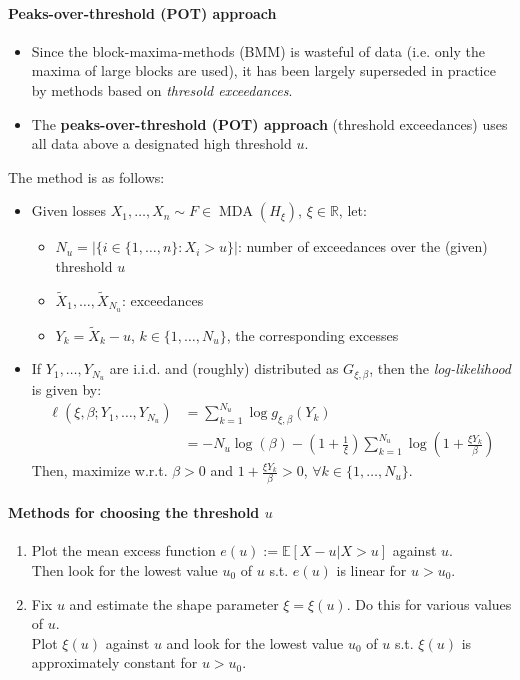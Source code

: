 \documentclass[a4paper,landscape,8pt,fleqn]{scrartcl}
\renewcommand{\emph}[1]{\textbf{#1}}
\DeclareMathOperator{\MDA}{MDA}			%
\begin{document}
\begin{multicols*}{3}
\paragraph{Peaks-over-threshold (POT) approach}
\begin{itemize}
\item Since the block-maxima-methods (BMM) is wasteful of data (i.e. only the maxima of large blocks are used), it has been largely superseded in practice by methods based on \textit{thresold exceedances}.
\item The \emph{peaks-over-threshold (POT) approach} (threshold exceedances) uses all data above a designated high threshold $u$.
\end{itemize}
The method is as follows:
\begin{itemize}
\item Given losses $X_1, \ldots, X_n \sim F \in \MDA(H_\xi)$, $\xi \in \mathbb{R}$, let:
\begin{itemize}
\item $N_u = \left| \lbrace i \in \lbrace 1, \ldots, n \rbrace : X_i > u \rbrace \right|$: number of exceedances over the (given) threshold $u$
\item $\tilde X_1, \ldots, \tilde X_{N_u}$: exceedances
\item $Y_k = \tilde X_k - u$, $k \in \lbrace 1, \ldots, N_u \rbrace$, the corresponding excesses
\end{itemize}
\item If $Y_1, \ldots, Y_{N_u}$ are i.i.d. and (roughly) distributed as $G_{\xi, \beta}$, then the \textit{log-likelihood} is given by:
\begin{align*}
\ell (\xi, \beta; Y_1, \ldots, Y_{N_u}) &= \sum_{k=1}^{N_u} \log g_{\xi, \beta}(Y_k) \\
&= -N_u \log(\beta) - \left( 1+\frac{1}{\xi} \right) \sum_{k=1}^{N_u} \log \left( 1 + \frac{\xi Y_k}{\beta} \right)
\end{align*}
Then, maximize w.r.t. $\beta > 0$ and $1 + \frac{\xi Y_k}{\beta} > 0$, $\forall k \in \lbrace 1, \ldots, N_u \rbrace$.
\end{itemize}

\paragraph{Methods for choosing the threshold $u$}
\begin{enumerate}
\item Plot the mean excess function $e(u) := \mathbb{E}[X-u | X > u]$ against $u$. \\
Then look for the lowest value $u_0$ of $u$ s.t. $e(u)$ is linear for $u > u_0$.
\item Fix $u$ and estimate the shape parameter $\xi = \xi(u)$. Do this for various values of $u$. \\
Plot $\xi(u)$ against $u$ and look for the lowest value $u_0$ of $u$ s.t. $\xi(u)$ is approximately constant for $u > u_0$.
\end{enumerate}


\end{multicols*}
\end{document}
